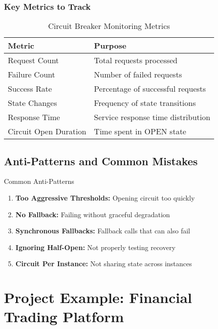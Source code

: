 \documentclass[12pt,a4paper]{article}
\begin{document}
\subsubsection{Key Metrics to Track}

\begin{table}[H]
\centering
\begin{tabular}{|l|l|}
\hline
\textbf{Metric} & \textbf{Purpose} \\
\hline
Request Count & Total requests processed \\
\hline
Failure Count & Number of failed requests \\
\hline
Success Rate & Percentage of successful requests \\
\hline
State Changes & Frequency of state transitions \\
\hline
Response Time & Service response time distribution \\
\hline
Circuit Open Duration & Time spent in OPEN state \\
\hline
\end{tabular}
\caption{Circuit Breaker Monitoring Metrics}
\end{table}

\subsection{Anti-Patterns and Common Mistakes}

\begin{warningbox}{Common Anti-Patterns}
\begin{enumerate}
    \item \textbf{Too Aggressive Thresholds:} Opening circuit too quickly
    \item \textbf{No Fallback:} Failing without graceful degradation
    \item \textbf{Synchronous Fallbacks:} Fallback calls that can also fail
    \item \textbf{Ignoring Half-Open:} Not properly testing recovery
    \item \textbf{Circuit Per Instance:} Not sharing state across instances
\end{enumerate}
\end{warningbox}

\section{Project Example: Financial Trading Platform}
\end{document}
